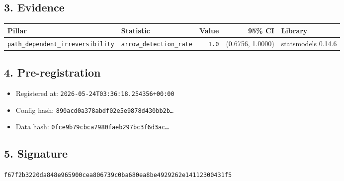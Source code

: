 \documentclass{article}
\begin{document}
\subsection*{3. Evidence}
\begin{tabular}{llrrl}\toprule
\textbf{Pillar} & \textbf{Statistic} & \textbf{Value} & \textbf{95\% CI} & \textbf{Library} \\\midrule
\texttt{path\_dependent\_irreversibility} & \texttt{arrow\_detection\_rate} & \texttt{1.0} & (0.6756, 1.0000) & statsmodels 0.14.6 \\
\bottomrule\end{tabular}
\subsection*{4. Pre-registration}
\begin{itemize}
\item Registered at: \texttt{2026-05-24T03:36:18.254356+00:00}
\item Config hash: \texttt{890acd0a378abdf02e5e9878d430bb2b\dots}
\item Data hash: \texttt{0fce9b79cbca7980faeb297bc3f6d3ac\dots}
\end{itemize}
\subsection*{5. Signature}
\texttt{f67f2b3220da848e965900cea806739c0ba680ea8be4929262e14112300431f5}\\
\end{document}
